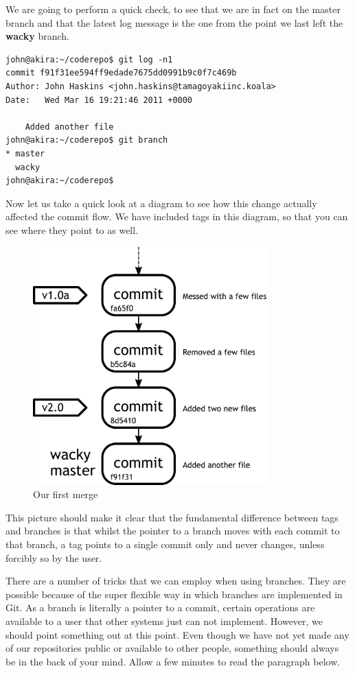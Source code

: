 We are going to perform a quick check, to see that we are in fact on the master branch and that the latest log message is the one from the point we last left the \textbf{wacky} branch.

\begin{Verbatim}[frame=leftline,framerule=1mm,fontsize=\relsize{-3}] 
john@akira:~/coderepo$ git log -n1
commit f91f31ee594ff9edade7675dd0991b9c0f7c469b
Author: John Haskins <john.haskins@tamagoyakiinc.koala>
Date:   Wed Mar 16 19:21:46 2011 +0000

    Added another file
john@akira:~/coderepo$ git branch
* master
  wacky
john@akira:~/coderepo$ 
\end{Verbatim}

Now let us take a quick look at a diagram to see how this change actually affected the commit flow.  We have included tags in this diagram, so that you can see where they point to as well.

\begin{figure}[hbt]
\centering
\includegraphics[width=9cm]{images/f-w4-d2.pdf}
\caption{Our first merge}
\end{figure}

This picture should make it clear that the fundamental difference between tags and branches is that whilst the pointer to a branch moves with each commit to that branch, a tag points to a single commit only and never changes, unless forcibly so by the user.

There are a number of tricks that we can employ when using branches.  They are possible because of the super flexible way in which branches are implemented in Git.  As a branch is literally a pointer to a commit, certain operations are available to a user that other systems just can not implement.  However, we should point something out at this point.  Even though we have not yet made any of our repositories public or available to other people, something should always be in the back of your mind.  Allow a few minutes to read the paragraph below.

